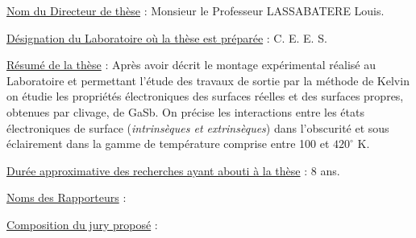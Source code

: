 \uline{Nom du Directeur de thèse} : Monsieur le Professeur LASSABATERE Louis.

\uline{Désignation du Laboratoire où la thèse est préparée} : C. E. E. S.

\uline{Résumé de la thèse} : Après avoir décrit le montage expérimental réalisé au Laboratoire et permettant l'étude des travaux de sortie par la méthode de Kelvin on étudie les propriétés électroniques des surfaces réelles et des surfaces propres, obtenues par clivage, de GaSb. On précise les interactions entre les états électroniques de surface (\textit{intrinsèques et extrinsèques}) dans l'obscurité et sous éclairement dans la gamme de température comprise entre 100 et $420^\circ$ K.

\uline{Durée approximative des recherches ayant abouti à la thèse} : 8 ans.

\uline{Noms des Rapporteurs} :


\uline{Composition du jury proposé} :


